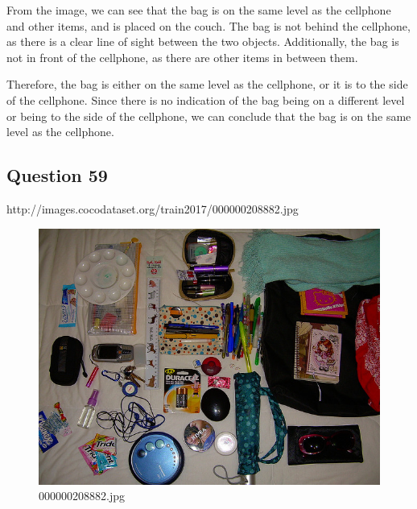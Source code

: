 \begin{enumerate}
    From the image, we can see that the bag is on the same level as the cellphone and other items, and is placed on the couch. The bag is not behind the cellphone, as there is a clear line of sight between the two objects. Additionally, the bag is not in front of the cellphone, as there are other items in between them.
    
    Therefore, the bag is either on the same level as the cellphone, or it is to the side of the cellphone. Since there is no indication of the bag being on a different level or being to the side of the cellphone, we can conclude that the bag is on the same level as the cellphone.
\end{enumerate}
\subsection*{Question 59}
http://images.cocodataset.org/train2017/000000208882.jpg
\begin{figure}[h]
    \centering
    \includegraphics[width=0.8\linewidth]{../image set/hard/000000208882.jpg}
    \caption{000000208882.jpg}
\end{figure}
